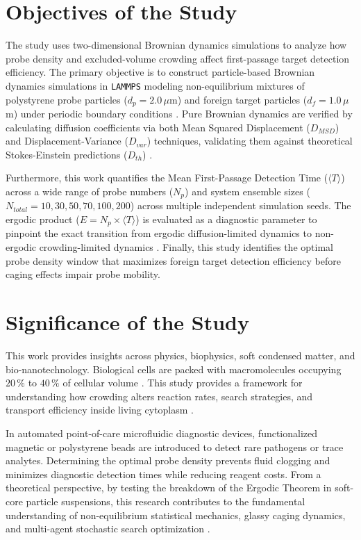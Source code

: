 \section{Objectives of the Study}
\label{sec:1.4}
\hspace{\parindent} The study uses two-dimensional Brownian dynamics simulations to analyze how probe density and excluded-volume crowding affect first-passage target detection efficiency. The primary objective is to construct particle-based Brownian dynamics simulations in \texttt{LAMMPS} modeling non-equilibrium mixtures of polystyrene probe particles ($d_p = 2.0\, \mu$m) and foreign target particles ($d_f = 1.0 \,\mu$m) under periodic boundary conditions \cite{Thompson2022}. Pure Brownian dynamics are verified by calculating diffusion coefficients via both Mean Squared Displacement ($D_{MSD}$) and Displacement-Variance ($D_{var}$) techniques, validating them against theoretical Stokes-Einstein predictions ($D_{th}$) \cite{Einstein1956, Cusi2020, balejado2025}.

\hspace{\parindent} Furthermore, this work quantifies the Mean First-Passage Detection Time ($\langle T \rangle$) across a wide range of probe numbers ($N_p$) and system ensemble sizes ($N_{total} = 10, 30, 50, 70, 100, 200$) across multiple independent simulation seeds. The ergodic product ($E = N_p \times \langle T \rangle$) is evaluated as a diagnostic parameter to pinpoint the exact transition from ergodic diffusion-limited dynamics to non-ergodic crowding-limited dynamics \cite{Loverdo2008}. Finally, this study identifies the optimal probe density window that maximizes foreign target detection efficiency before caging effects impair probe mobility. 

\section{Significance of the Study}
\label{sec:1.5}
\hspace{\parindent} This work provides insights across physics, biophysics, soft condensed matter, and bio-nanotechnology. Biological cells are packed with macromolecules occupying $20\,\%$ to $40\,\%$ of cellular volume \cite{Loverdo2008, Benichou2011}. This study provides a framework for understanding how crowding alters reaction rates, search strategies, and transport efficiency inside living cytoplasm \cite{Loverdo2008, Redner2001}.

\hspace{\parindent} In automated point-of-care microfluidic diagnostic devices, functionalized magnetic or polystyrene beads are introduced to detect rare pathogens or trace analytes. Determining the optimal probe density prevents fluid clogging and minimizes diagnostic detection times while reducing reagent costs. From a theoretical perspective, by testing the breakdown of the Ergodic Theorem in soft-core particle suspensions, this research contributes to the fundamental understanding of non-equilibrium statistical mechanics, glassy caging dynamics, and multi-agent stochastic search optimization \cite{Redner2001, Zwanzig2001, Weeks2000}.

